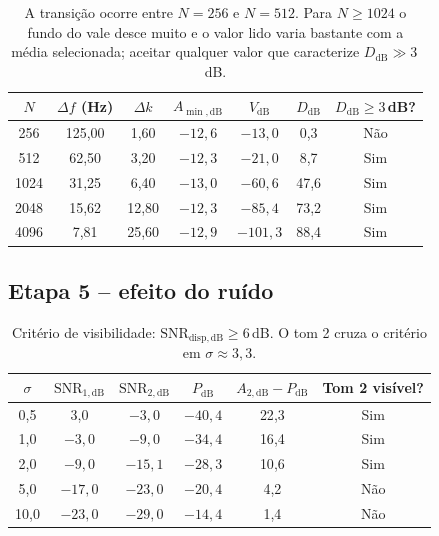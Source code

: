 \documentclass[11pt,a4paper]{article}
\begin{document}
\begin{table}[H]\centering
\setlength{\tabcolsep}{5pt}
\begin{tabular}{c c c c c c c}
  \toprule
  $N$ & $\Delta f$ (Hz) & $\Delta k$ & $A_{\min,\mathrm{dB}}$ &
    $V_{\mathrm{dB}}$ & $D_{\mathrm{dB}}$ & $D_{\mathrm{dB}} \geq 3$\,dB? \\
  \midrule
  256  & 125{,}00 & 1{,}60  & $-12{,}6$ & $-13{,}0$  & 0{,}3  & Não \\
  512  & 62{,}50  & 3{,}20  & $-12{,}3$ & $-21{,}0$  & 8{,}7  & Sim \\
  1024 & 31{,}25  & 6{,}40  & $-13{,}0$ & $-60{,}6$  & 47{,}6 & Sim \\
  2048 & 15{,}62  & 12{,}80 & $-12{,}3$ & $-85{,}4$  & 73{,}2 & Sim \\
  4096 & 7{,}81   & 25{,}60 & $-12{,}9$ & $-101{,}3$ & 88{,}4 & Sim \\
  \bottomrule
\end{tabular}
\caption*{A transição ocorre entre $N = 256$ e $N = 512$. Para $N \geq 1024$ o
fundo do vale desce muito e o valor lido varia bastante com a média
selecionada; aceitar qualquer valor que caracterize $D_{\mathrm{dB}} \gg 3$\,dB.}
\end{table}

\subsection*{Etapa 5 -- efeito do ruído}

\begin{table}[H]\centering
\setlength{\tabcolsep}{5pt}
\begin{tabular}{c c c c c c}
  \toprule
  $\sigma$ & $\mathrm{SNR}_{1,\mathrm{dB}}$ & $\mathrm{SNR}_{2,\mathrm{dB}}$ &
    $P_{\mathrm{dB}}$ & $A_{2,\mathrm{dB}} - P_{\mathrm{dB}}$ & Tom 2 visível? \\
  \midrule
  0{,}5  & 3{,}0     & $-3{,}0$  & $-40{,}4$ & 22{,}3 & Sim \\
  1{,}0  & $-3{,}0$  & $-9{,}0$  & $-34{,}4$ & 16{,}4 & Sim \\
  2{,}0  & $-9{,}0$  & $-15{,}1$ & $-28{,}3$ & 10{,}6 & Sim \\
  5{,}0  & $-17{,}0$ & $-23{,}0$ & $-20{,}4$ & 4{,}2  & Não \\
  10{,}0 & $-23{,}0$ & $-29{,}0$ & $-14{,}4$ & 1{,}4  & Não \\
  \bottomrule
\end{tabular}
\caption*{Critério de visibilidade: $\mathrm{SNR}_{\mathrm{disp,dB}} \geq 6$\,dB.
O tom 2 cruza o critério em $\sigma \approx 3{,}3$.}
\end{table}
\end{document}

